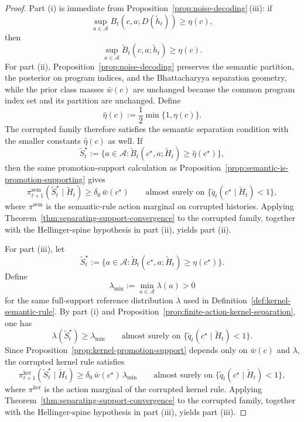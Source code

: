 \documentclass[11pt]{article}
\theoremstyle{definition}
\theoremstyle{remark}
\newcommand{\Acal}{\mathcal{A}}
\begin{document}
\begin{proof}
Part \textup{(i)} is immediate from Proposition~\ref{prop:noise-decoding}\,\textup{(iii)}: if
\[
\sup_{a\in\Acal}B_t(c,a;D(\widetilde h_t))\ge \eta(c),
\]
then
\[
\sup_{a\in\Acal}\widetilde B_t(c,a;\widetilde h_t)\ge \eta(c).
\]
For part \textup{(ii)}, Proposition~\ref{prop:noise-decoding} preserves the semantic partition, the posterior on program indices, and the Bhattacharyya separation geometry, while the prior class masses $\bar w(c)$ are unchanged because the common program index set and its partition are unchanged. Define
\[
\hat\eta(c):=\frac{1}{2}\min\{1,\eta(c)\}.
\]
The corrupted family therefore satisfies the semantic separation condition with the smaller constants $\hat\eta(c)$ as well. If
\[
\widetilde S_t^\star:=\{a\in\Acal:\widetilde B_t(c^\star,a;\widetilde H_t)\ge \hat\eta(c^\star)\},
\]
then the same promotion-support calculation as Proposition~\ref{prop:semantic-is-promotion-supporting} gives
\[
\pi_{t+1}^{\mathrm{sem}}(\widetilde S_t^\star\mid \widetilde H_t)\ge \delta_0\,\bar w(c^\star)
\qquad\text{almost surely on }\{\widetilde q_t(c^\star\mid \widetilde H_t)<1\},
\]
where $\pi^{\mathrm{sem}}$ is the semantic-rule action marginal on corrupted histories. Applying Theorem~\ref{thm:separating-support-convergence} to the corrupted family, together with the Hellinger-spine hypothesis in part \textup{(ii)}, yields part \textup{(ii)}.

For part \textup{(iii)}, let
\[
\widetilde S_t^\star:=\{a\in\Acal:\widetilde B_t(c^\star,a;\widetilde H_t)\ge \eta(c^\star)\}.
\]
Define
\[
\lambda_{\min}:=\min_{a\in\Acal}\lambda(a)>0
\]
for the same full-support reference distribution $\lambda$ used in Definition~\ref{def:kernel-semantic-rule}. By part \textup{(i)} and Proposition~\ref{prop:finite-action-kernel-separation}, one has
\[
\lambda(\widetilde S_t^\star)\ge \lambda_{\min}
\qquad\text{almost surely on }\{\widetilde q_t(c^\star\mid \widetilde H_t)<1\}.
\]
Since Proposition~\ref{prop:kernel-promotion-support} depends only on $\bar w(c)$ and $\lambda$, the corrupted kernel rule satisfies
\[
\pi_{t+1}^{\mathrm{ker}}(\widetilde S_t^\star\mid \widetilde H_t)\ge \delta_0\,\bar w(c^\star)\,\lambda_{\min}
\qquad\text{almost surely on }\{\widetilde q_t(c^\star\mid \widetilde H_t)<1\},
\]
where $\pi^{\mathrm{ker}}$ is the action marginal of the corrupted kernel rule. Applying Theorem~\ref{thm:separating-support-convergence} to the corrupted family, together with the Hellinger-spine hypothesis in part \textup{(iii)}, yields part \textup{(iii)}.


\end{proof}
\end{document}
